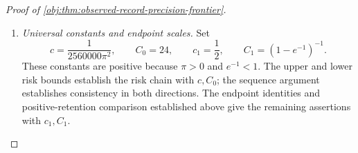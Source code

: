 \begin{proof}[Proof of \cref{obj:thm:observed-record-precision-frontier}]
\begin{enumerate}
Choose the measurable rule sequence
\[
T_n(O,\xi)=T^\star_{n,d_n,q_n}(O),
\qquad n\ge4.
\]
The upper risk bound then supplies
\[
0\le
\sup_{\theta\in\mathcal M_{n,d_n}}
\mathcal L(T_n;\theta,q_n)
\le24F(n,d_n,q_n)
\longrightarrow0.
\]
Together with necessity, this proves the asserted equivalence.

\item \textit{Universal constants and endpoint scales.}
Set
\[
c=\frac1{2560000\pi^2},
\qquad
C_0=24,
\qquad
c_1=\frac12,
\qquad
C_1=(1-e^{-1})^{-1}.
\]
These constants are positive because \(\pi>0\) and \(e^{-1}<1\).
The upper and lower risk bounds establish the risk chain with \(c,C_0\);
the sequence argument establishes consistency in both directions.
The endpoint identities and positive-retention comparison established above
give the remaining assertions with \(c_1,C_1\).
\end{enumerate}
\end{proof}


